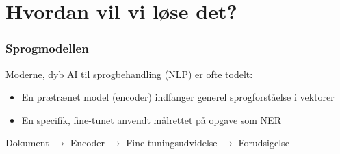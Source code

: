 \documentclass{beamer}
\begin{document}
\newcommand{\nw}[2]{
    \tikz[baseline=(#2.base), inner sep = 0pt]{\node (#2) {\underline{#1}};}
}

\section{Hvordan vil vi løse det?}
\begin{frame}
    \frametitle{Sprogmodellen}
    Moderne, dyb AI til sprogbehandling (NLP) er ofte todelt:
    \begin{itemize}
        \item En prætrænet model (encoder) indfanger generel sprogforståelse i vektorer
        \item En specifik, fine-tunet anvendt målrettet på opgave som NER
    \end{itemize}
    Dokument $ \to $ Encoder $ \to $ Fine-tuningsudvidelse $ \to $ Forudsigelse
\end{frame}
\end{document}
